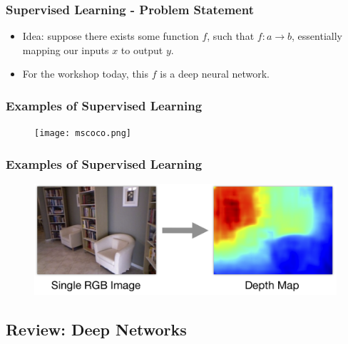 \documentclass{beamer}
\begin{document}
\begin{frame}
  \frametitle{Supervised Learning - Problem Statement}
  \begin{itemize}
  \item Idea: suppose there exists some function $f$, such that $f: a \rightarrow b$, essentially mapping our inputs $x$ to output $y$.
  \item For the workshop today, this $f$ is a deep neural network.
  \end{itemize}
\end{frame}

\begin{frame}
  \frametitle{Examples of Supervised Learning}
  \begin{figure}
    \texttt{[image: mscoco.png]}
  \end{figure}
\end{frame}

\begin{frame}
  \frametitle{Examples of Supervised Learning}
  \begin{figure}
    \includegraphics[width=0.8\linewidth]{depth_prediction.png}
  \end{figure}
\end{frame}

\subsection{Review: Deep Networks} %
\end{document}
